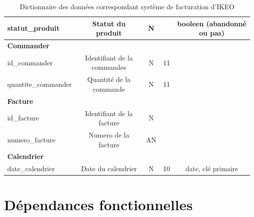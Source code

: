 \documentclass[french]{article}
\begin{document}
\begin{table}[!htbp]
\begin{tabular}{|lcccl|}
\multicolumn{1}{|l|}{statut\_produit}      & \multicolumn{1}{c|}{Statut du produit}           & \multicolumn{1}{c|}{N}             & \multicolumn{1}{l|}{}                & \multicolumn{1}{c|}{booleen (abandonné ou pas)} \\ \hline
\multicolumn{5}{|l|}{\textbf{Commander}}                                                                                                                                                            \\ \hline
\multicolumn{1}{|l|}{id\_commander}        & \multicolumn{1}{c|}{Identifiant de la commandes} & \multicolumn{1}{c|}{N}             & \multicolumn{1}{c|}{11}              &                                                 \\ \hline
\multicolumn{1}{|l|}{quantite\_commander}  & \multicolumn{1}{c|}{Quantité de la commande}     & \multicolumn{1}{c|}{N}             & \multicolumn{1}{c|}{11}              &                                                 \\ \hline
\multicolumn{5}{|l|}{\textbf{Facture}}                                                                                                                                                              \\ \hline
\multicolumn{1}{|l|}{id\_facture}          & \multicolumn{1}{c|}{Identifiant de la facture}   & \multicolumn{1}{c|}{N}             & \multicolumn{1}{l|}{}                &                                                 \\ \hline
\multicolumn{1}{|l|}{numero\_facture}      & \multicolumn{1}{c|}{Numero de la facture}        & \multicolumn{1}{c|}{AN}            & \multicolumn{1}{l|}{}                &                                                 \\ \hline
\multicolumn{5}{|l|}{\textbf{Calendrier}}                                                                                                                                                           \\ \hline
\multicolumn{1}{|l|}{date\_calendrier}     & \multicolumn{1}{c|}{Date du calendrier}          & \multicolumn{1}{c|}{N}             & \multicolumn{1}{c|}{10}              & \multicolumn{1}{c|}{date, clé primaire}         \\ \hline
\end{tabular}
\caption{Dictionnaire des données correspondant système de facturation d'IKEO}
\end{table}

\section{Dépendances fonctionnelles}
\end{document}
